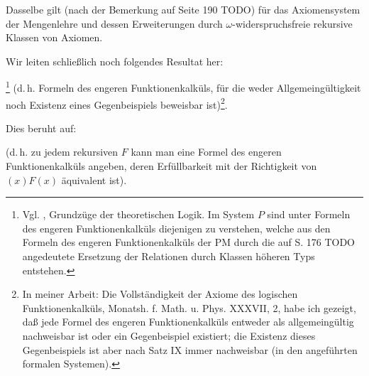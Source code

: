 \documentclass{scrartcl}
\begin{document}

Dasselbe gilt (nach der Bemerkung auf Seite 190 TODO)
für das Axiomensystem der Mengenlehre und dessen Erweiterungen durch $\omega$-widerspruchsfreie rekursive
Klassen von Axiomen.

Wir leiten schließlich noch folgendes Resultat her:

\footnote{Vgl. , Grundzüge der theoretischen Logik. Im System $P$ sind unter Formeln des engeren Funktionenkalküls diejenigen zu verstehen, welche aus den Formeln des engeren Funktionenkalküls der PM durch die auf S. 176 TODO angedeutete Ersetzung der Relationen durch Klassen höheren Typs entstehen.}
(d.\,h. Formeln des engeren Funktionenkalküls, für die weder Allgemeingültigkeit noch Existenz eines Gegenbeispiels beweisbar ist)\footnote{In meiner Arbeit: Die Vollständigkeit der Axiome des logischen Funktionenkalküls, Monatsh. f. Math. u. Phys. XXXVII, 2, habe ich gezeigt, daß jede Formel des engeren Funktionenkalküls entweder als allgemeingültig nachweisbar ist oder ein Gegenbeispiel existiert; die Existenz dieses Gegenbeispiels ist aber nach Satz IX  immer nachweisbar (in den angeführten formalen Systemen).}.

Dies beruht auf:

 (d.\,h. zu jedem rekursiven $F$ kann man eine Formel des engeren Funktionenkalküls angeben, deren Erfüllbarkeit mit der Richtigkeit von $(x)F(x)$ äquivalent ist).
\end{document}
